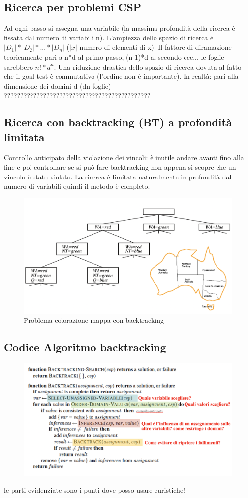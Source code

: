 \documentclass{article}
\begin{document}
\subsection{Ricerca per problemi CSP}
Ad ogni passo si assegna una variabile (la massima profondità della ricerca è fissata dal numero di variabili n). L’ampiezza dello spazio di ricerca è $|D_1| * |D_2| * ... * |D_n|$ ($|x|$ numero di elementi di x). Il fattore di diramazione teoricamente pari a n*d al primo passo, (n-1)*d al secondo ecc... le foglie sarebbero $n! * d^n$. Una riduzione drastica dello spazio di ricerca dovuta al fatto che il goal-test è commutativo (l’ordine non è importante). In realtà: pari alla dimensione dei domini d (dn foglie)
?????????????????????????????????????????????
\subsection{Ricerca con backtracking (BT) a profondità limitata}
Controllo anticipato della violazione dei vincoli: è inutile andare avanti fino alla fine e poi controllare se si può fare backtracking non appena si scopre che un vincolo è stato violato. La ricerca è limitata naturalmente in profondità dal numero di variabili quindi il metodo è completo.
\begin{figure}[h!]
\centering
\includegraphics[scale=0.4]{Images/mappacoloratabacktracking.png}
\caption{Problema colorazione mappa con backtracking}
\end{figure}
\clearpage
\subsection{Codice Algoritmo backtracking}
\begin{figure}[h!]
\centering
\includegraphics[scale=0.4]{Images/algoritmobacktracking.png}
\end{figure}
le parti evidenziate sono i punti dove posso usare euristiche!
\end{document}
